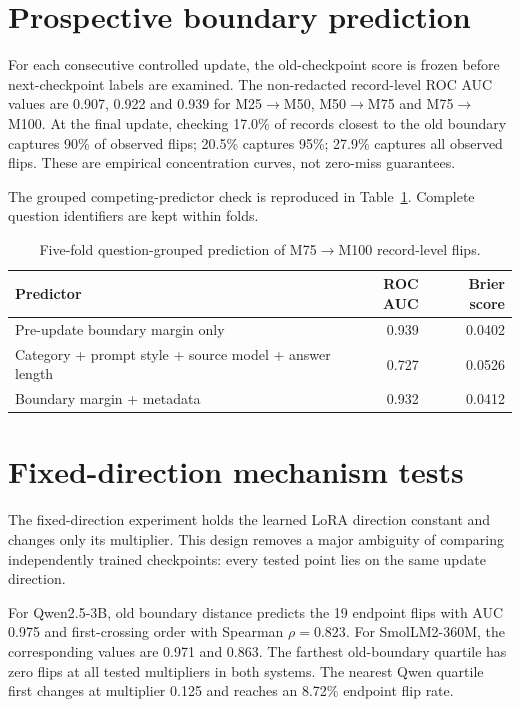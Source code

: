 \documentclass[11pt,letterpaper]{article}
\theoremstyle{plain}
\newcommand{\1}{\mathbf 1}
\begin{document}
\section{Prospective boundary prediction}
For each consecutive controlled update, the old-checkpoint score is frozen before next-checkpoint labels are examined. The non-redacted record-level ROC AUC values are 0.907, 0.922 and 0.939 for M25$\rightarrow$M50, M50$\rightarrow$M75 and M75$\rightarrow$M100. At the final update, checking 17.0\% of records closest to the old boundary captures 90\% of observed flips; 20.5\% captures 95\%; 27.9\% captures all observed flips. These are empirical concentration curves, not zero-miss guarantees.

The grouped competing-predictor check is reproduced in Table~\ref{tab:s_predictors}. Complete question identifiers are kept within folds.

\begin{table}[H]
\centering
\caption{Five-fold question-grouped prediction of M75$\rightarrow$M100 record-level flips.}
\label{tab:s_predictors}
\begin{tabular}{lrr}
\toprule
Predictor & ROC AUC & Brier score \\
\midrule
Pre-update boundary margin only & 0.939 & 0.0402 \\
Category + prompt style + source model + answer length & 0.727 & 0.0526 \\
Boundary margin + metadata & 0.932 & 0.0412 \\
\bottomrule
\end{tabular}
\end{table}

\section{Fixed-direction mechanism tests}
The fixed-direction experiment holds the learned LoRA direction constant and changes only its multiplier. This design removes a major ambiguity of comparing independently trained checkpoints: every tested point lies on the same update direction.

For Qwen2.5-3B, old boundary distance predicts the 19 endpoint flips with AUC 0.975 and first-crossing order with Spearman $\rho=0.823$. For SmolLM2-360M, the corresponding values are 0.971 and 0.863. The farthest old-boundary quartile has zero flips at all tested multipliers in both systems. The nearest Qwen quartile first changes at multiplier 0.125 and reaches an 8.72\% endpoint flip rate.
\end{document}
